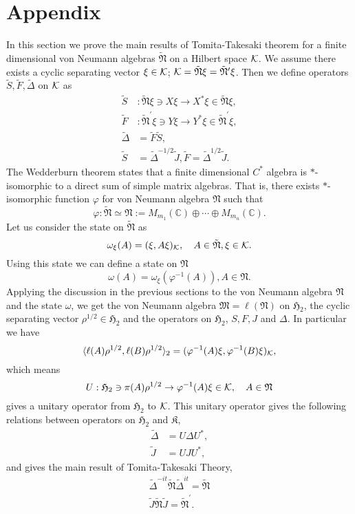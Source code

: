 \section{Appendix}
In this section we prove the main results of Tomita-Takesaki theorem for a finite dimensional
von Neumann algebras $\tilde{\mathfrak{N}}$ on a Hilbert space $\cal{K}$.
We assume there exists a cyclic separating vector $\xi\in {\cal K}$;
$\cal{K}=\tilde{\mathfrak{N}}\xi=\tilde{\mathfrak{N}}^\prime\xi$.
Then we define operators $\tilde{S},\tilde{F},\tilde{\Delta}$ on $\cal{K}$ as
\begin{equation}
\begin{split}
\tilde{S}&:\tilde{\mathfrak{N}}\xi\ni X\xi \to X^\ast \xi \in \tilde{\mathfrak{N}}\xi,\\
\tilde{F}&:\tilde{\mathfrak{N}}^\prime\xi\ni Y\xi \to Y^\ast \xi \in \tilde{\mathfrak{N}}^\prime\xi,\\
\tilde{\Delta}&=\tilde{F}\tilde{S},\\
\tilde{S}&=\tilde{\Delta}^{-1/2}\tilde{J}, \tilde{F}=\tilde{\Delta}^{1/2}\tilde{J}.
\end{split}
\end{equation}
The Wedderburn theorem states that a finite dimensional $C^{\ast}$ algebra is  $\ast$-isomorphic to a direct sum of simple matrix algebras. That is, there exists $\ast$-isomorphic function $\varphi$ for von Neumann algebra $\mathfrak{N}$ such that
$$
\varphi:\tilde{\mathfrak{N}}\simeq \mathfrak{N}:=M_{m_1}(\mathbb{C})\oplus \cdots \oplus M_{m_n}(\mathbb{C}).
$$
Let us consider the state on $\tilde{\mathfrak{N}}$ as
$$
\omega_\xi(A)=(\xi,A\xi)_{{\cal K}},\quad A\in \tilde{\mathfrak{N}},\xi\in {\cal K}.
$$
Using this state we can define a state on $\mathfrak{N}$
$$
\omega(A)=\omega_\xi(\varphi^{-1}(A)),A\in \mathfrak{N}.
$$
Applying the discussion in the previous sections to the von Neumann algebra $\mathfrak{N}$ and the state
$\omega$, we get
the von Neumann algebra $\mathfrak{M}=\ell (\mathfrak{N})$ on  
$\mathfrak{H}_2$, the cyclic separating vector $\rho^{1/2}\in \mathfrak{H}_2$
and the operators on $\mathfrak{H}_2$, $S, F, J$ and $\Delta$.
In particular we have
$$
\langle \ell(A)\rho^{1/2},\ell( B)\rho^{1/2}\rangle_2=(\varphi^{-1}(A)\xi,\varphi^{-1}(B)\xi)_{\cal K},
$$
which means
$$
U:\mathfrak{H}_2\ni\pi(A)\rho^{1/2}\to \varphi^{-1}(A)\xi\in {\cal K}, \quad A\in \mathfrak{N}
$$
gives a unitary operator from $\mathfrak{H}_2$ to ${\cal K}$.
This unitary operator gives the following relations between operators on $\mathfrak{H}_2$ and $\mathfrak{K}$,
\begin{equation}
\begin{split}
\tilde{\Delta}&=U\Delta U^{\ast},\\
\tilde{J}&=UJU^\ast ,
\end{split}
\end{equation}
and gives the main result of Tomita-Takesaki Theory,
\begin{equation}
\begin{split}
\tilde{\Delta}^{-it}\tilde{\mathfrak{N}}\tilde{\Delta}^{it}=\tilde{\mathfrak{N}}\\
\tilde{J}\tilde{\mathfrak{N}}\tilde{J}=\tilde{\mathfrak{N}}^\prime.
\end{split}
\end{equation}



